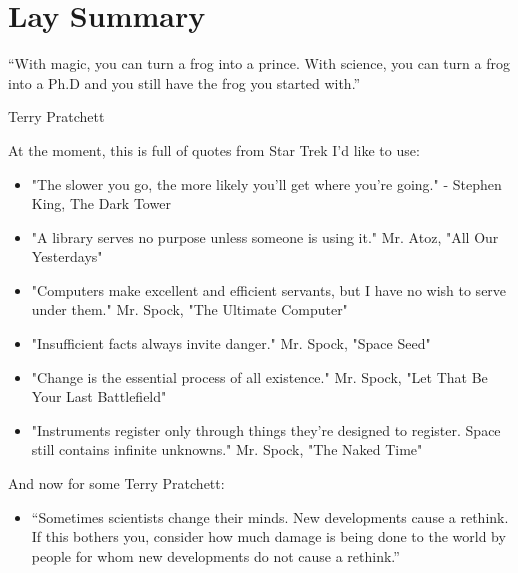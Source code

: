 \chapter{Lay Summary}
\epigraph{“With magic, you can turn a frog into a prince. With science, you can turn a frog into a Ph.D and you still have the frog you started with.”}{Terry Pratchett}

At the moment, this is full of quotes from Star Trek I'd like to use:

\begin{itemize}
    \item "The slower you go, the more likely you'll get where you're going." - Stephen King, The Dark Tower
    \item "A library serves no purpose unless someone is using it." Mr. Atoz, "All Our Yesterdays"
    \item "Computers make excellent and efficient servants, but I have no wish to serve under them." Mr. Spock, "The Ultimate Computer"
    \item "Insufficient facts always invite danger." Mr. Spock, "Space Seed"
    \item "Change is the essential process of all existence." Mr. Spock, "Let That Be Your Last Battlefield"
    \item "Instruments register only through things they're designed to register. Space still contains infinite unknowns." Mr. Spock, "The Naked Time"
\end{itemize}

And now for some Terry Pratchett:

\begin{itemize}
    \item “Sometimes scientists change their minds. New developments cause a rethink. If this bothers you, consider how much damage is being done to the world by people for whom new developments do not cause a rethink.”

\end{itemize}